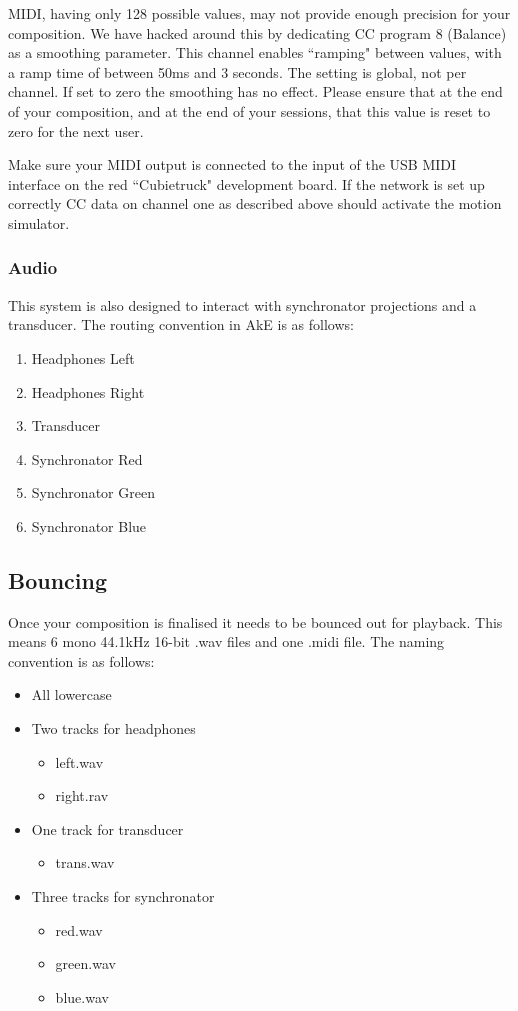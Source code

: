 \documentclass{article}
\begin{document}
	MIDI, having only 128 possible values, may not provide enough precision for 
	your composition. We have hacked around this by dedicating CC program 8 
	(Balance) as a smoothing parameter. This channel enables ``ramping" between 
	values, with a ramp time of between 50ms and 3 seconds. The setting is 
	global, not per channel. If set to zero the smoothing has no effect. Please 
	ensure that at the end of your composition, and at the end of your 
	sessions, that this value is reset to zero for the next user.

	Make sure your MIDI output is connected to the input of the USB MIDI 
	interface on the red ``Cubietruck" development board. If the network is set 
	up correctly CC data on channel one as described above should activate the 
	motion simulator.

	\subsubsection{Audio}
	This system is also designed to interact with synchronator projections and 	
	a transducer. The routing convention in AkE is as follows:

	\begin{enumerate}
		\item Headphones Left
		\item Headphones Right
		\item Transducer
		\item Synchronator Red
		\item Synchronator Green
		\item Synchronator Blue
	\end{enumerate}

	\subsection{Bouncing}
	Once your composition is finalised it needs to be bounced out for playback. 
	This means 6 mono 44.1kHz 16-bit .wav files and one .midi file. The naming 
	convention is as follows: 
	
	\begin{itemize}
		\item All lowercase
		\item Two tracks for headphones 
		\begin{itemize}
			\item left.wav
			\item right.rav
		\end{itemize}
		\item One track for transducer 
		\begin{itemize}
			\item trans.wav
		\end{itemize}
		\item Three tracks for synchronator
		\begin{itemize}
			\item red.wav
			\item green.wav
			\item blue.wav
		\end{itemize}
	\end{itemize}
\end{document}
